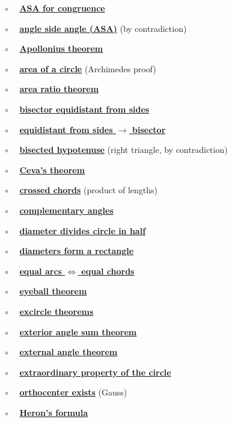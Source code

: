 \documentclass[11pt, oneside]{article}
\begin{document}
$\circ$ \ \ \hyperref[sec:ASA]{\textbf{ASA for congruence}}

$\circ$ \ \ \hyperref[sec:ASA_contradiction]{\textbf{angle side angle (ASA)}} (by contradiction)

$\circ$ \ \ \hyperref[sec:Apollonius_theorem]{\textbf{Apollonius theorem}}

$\circ$ \ \ \hyperref[sec:circle_area_Archimedes]{\textbf{area of a circle}} (Archimedes proof)

$\circ$ \ \ \hyperref[sec:area_ratio_theorem]{\textbf{area ratio theorem}}

$\circ$ \ \ \hyperref[sec:bisector_equidistant_sides]{\textbf{bisector equidistant from sides}}

$\circ$ \ \ \hyperref[sec:bisector_equidistant_sides_converse]{\textbf{equidistant from sides $\rightarrow$ bisector}}

$\circ$ \ \ \hyperref[sec:bisected_hypotenuse]{\textbf{bisected hypotenuse}} (right triangle, by contradiction)

$\circ$ \ \ \hyperref[sec:Ceva_theorem]{\textbf{Ceva's theorem}}

$\circ$ \ \ \hyperref[sec:chord_segments]{\textbf{crossed chords}} (product of lengths)

$\circ$ \ \ \hyperref[sec:complementary_angle_theorem]{\textbf{complementary angles}}

$\circ$ \ \ \hyperref[sec:diameter_of_a_circle]{\textbf{diameter divides circle in half}}

$\circ$ \ \ \hyperref[sec:diameters_form_rectangle]{\textbf{diameters form a rectangle}}

$\circ$ \ \ \hyperref[sec:equal_arcs_equal_chords]{\textbf{equal arcs $\iff$ equal chords}}

$\circ$ \ \ \hyperref[sec:eyeball_theorem]{\textbf{eyeball theorem}}

$\circ$ \ \ \hyperref[sec:excircle_theorems]{\textbf{excircle theorems}}

$\circ$ \ \ \hyperref[sec:exterior_angle_sum_theorem]{\textbf{exterior angle sum theorem}}

$\circ$ \ \ \hyperref[sec:external_angle_theorem]{\textbf{external angle theorem}}

$\circ$ \ \ \hyperref[sec:extraordinary_property]{\textbf{extraordinary property of the circle}}

$\circ$ \ \ \hyperref[sec:Gauss_orthocenter]{\textbf{orthocenter exists}} (Gauss)

$\circ$ \ \ \hyperref[sec:Heron_formula]{\textbf{Heron's formula}}
\end{document}

